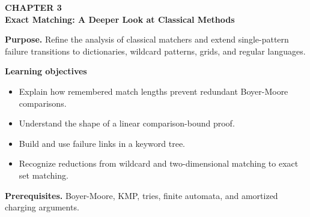 \documentclass[11pt]{article}
\begin{document}
\begin{tcolorbox}[
  enhanced,breakable,colback=Primary!4,colframe=Primary,boxrule=0.9pt,
  arc=2mm,left=3mm,right=3mm,top=2.5mm,bottom=2.5mm]
{\sffamily\color{Accent}\bfseries CHAPTER 3}\\[-1pt]
{\sffamily\LARGE\bfseries\color{Primary} Exact Matching: A Deeper Look at Classical Methods}

\vspace{2pt}
\textbf{Purpose.} Refine the analysis of classical matchers and extend single-pattern failure transitions to dictionaries, wildcard patterns, grids, and regular languages.

\textbf{Learning objectives}
\begin{itemize}
  \item Explain how remembered match lengths prevent redundant Boyer-Moore comparisons.
  \item Understand the shape of a linear comparison-bound proof.
  \item Build and use failure links in a keyword tree.
  \item Recognize reductions from wildcard and two-dimensional matching to exact set matching.
\end{itemize}

\textbf{Prerequisites.} Boyer-Moore, KMP, tries, finite automata, and amortized charging arguments.
\end{tcolorbox}
\end{document}
